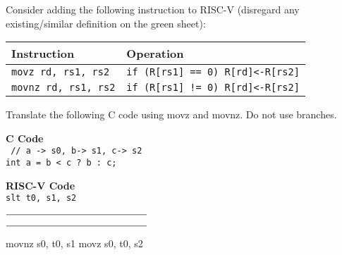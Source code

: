 \begin{blocksection}
Consider adding the following instruction to RISC-V 
(disregard any existing/similar definition on the green sheet):

\begin{tabular}{ |l|l| } 
 \hline
 \textbf{Instruction} & \textbf{Operation} \\ 
 \hline
 \texttt{movz rd, rs1, rs2} & \texttt{if (R[rs1] == 0) R[rd]<-R[rs2]}  \\ 
 \hline
 \texttt{movnz rd, rs1, rs2} & \texttt{if (R[rs1] != 0) R[rd]<-R[rs2]} \\ 
 \hline
\end{tabular}


\question
Translate the following C code using movz and movnz. Do not use branches.

\textbf{C Code} \\
\texttt{
// a -> s0, b-> s1, c-> s2 \\
int a = b < c ? b : c;
}



\textbf{RISC-V Code} \\
\texttt{slt t0, s1, s2}


$\rule{5cm}{0.15mm}$


$\rule{5cm}{0.15mm}$

    
\begin{solution}[0.5in]
 movnz s0, t0, s1
 movz s0, t0, s2
\end{solution}

\end{blocksection}